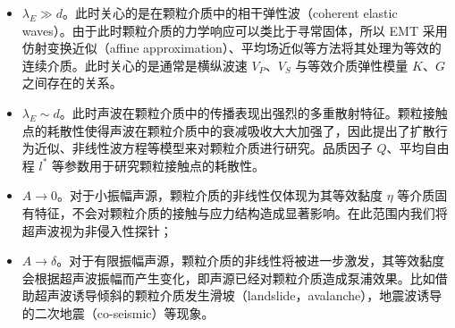 \begin{itemize}
  \item $\lambda_{E}\gg d$。此时关心的是在颗粒介质中的相干弹性波（coherent elastic waves）。由于此时颗粒介质的力学响应可以类比于寻常固体，所以 EMT 采用仿射变换近似（affine approximation）、平均场近似等方法将其处理为等效的连续介质。此时关心的是通常是横纵波速 $V_{P}$、$V_{S}$ 与等效介质弹性模量 $K$、$G$ 之间存在的关系。
  \item $\lambda_{E}\sim d$。此时声波在颗粒介质中的传播表现出强烈的多重散射特征。颗粒接触点的耗散性使得声波在颗粒介质中的衰减吸收大大加强了，因此提出了扩散行为近似\cite{PhysRevLett.93.154303}、非线性波方程\cite{Transitional,hamilton_nonlinear_1998}等模型来对颗粒介质进行研究。品质因子 $Q$、平均自由程 $l^{*}$ 等参数用于研究颗粒接触点的耗散性。
  \item $A\rightarrow 0$。对于小振幅声源，颗粒介质的非线性仅体现为其等效黏度 $\eta$ 等介质固有特征，不会对颗粒介质的接触与应力结构造成显著影响。在此范围内我们将超声波视为非侵入性探针；
  \item $A\rightarrow \delta$。对于有限振幅声源，颗粒介质的非线性将被进一步激发，其等效黏度会根据超声波振幅而产生变化，即声源已经对颗粒介质造成泵浦效果。比如借助超声波诱导倾斜的颗粒介质发生滑坡（landslide，avalanche）\cite{PhysRevE.102.042901}，地震波诱导的二次地震（co-seismic）\cite{Johnson_2005}等现象。
\end{itemize}

